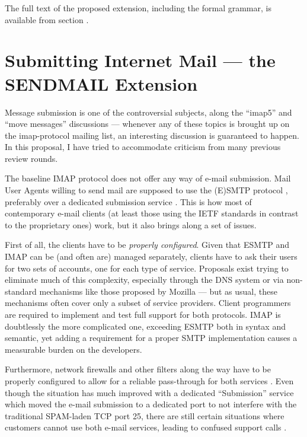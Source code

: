 \documentclass[trojita]{subfiles}
\begin{document}
The full text of the proposed extension, including the formal grammar, is available from section
.

\section{Submitting Internet Mail --- the SENDMAIL Extension}
\label{sec:draft-sendmail}

Message submission is one of the controversial subjects, along the ``imap5'' and ``move messages'' discussions ---
whenever any of these topics is brought up on the imap-protocol mailing list, an interesting discussion is guaranteed to
happen.  In this proposal, I have tried to accommodate criticism from many previous review rounds.

The baseline IMAP protocol does not offer any way of e-mail submission.  Mail User Agents willing to send mail are
supposed to use the (E)SMTP protocol \cite{rfc5321} \cite{rfc2821}, preferably over a dedicated submission service
\cite{rfc6409}.  This is how most of contemporary e-mail clients (at least those using the IETF standards in contrast
to the proprietary ones) work, but it also brings along a set of issues.

First of all, the clients have to be {\em properly configured}.  Given that ESMTP and IMAP can be (and often are)
managed separately, clients have to ask their users for two sets of accounts, one for each type of service.  Proposals
exist trying to eliminate much of this complexity, especially through the DNS system \cite{rfc6186} or via non-standard
mechanisms like those proposed by Mozilla \cite{mozilla-ispdb} --- but as usual, these mechanisms often cover only a
subset of service providers.  Client programmers are required to implement and test full support for both protocols.
IMAP is doubtlessly the more complicated one, exceeding ESMTP both in syntax and semantic, yet adding a requirement for
a proper SMTP implementation causes a measurable burden on the developers.

Furthermore, network firewalls and other filters along the way have to be properly configured to allow for a reliable
pass-through for both services \cite{crocker-beep-multi-conns}.  Even though the situation has much improved with a
dedicated ``Submission'' service \cite{rfc6409} which moved the e-mail submission to a dedicated port to not interfere
with the traditional SPAM-laden TCP port 25, there are still certain situations where customers cannot use both e-mail
services, leading to confused support calls \cite{submission-users-suck-smtp-imap} \cite{panozzo-submission-users-suck}.
\end{document}
